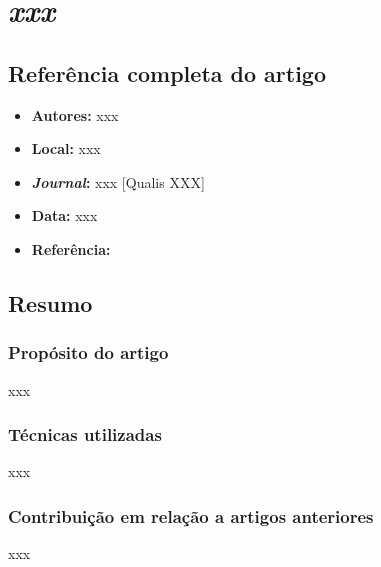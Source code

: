 \section{\textit{xxx}}


\subsection{Referência completa do artigo}

\begin{itemize}
  \item \textbf{Autores:} xxx
  \item \textbf{Local:} xxx
  \item \textbf{\textit{Journal}:} xxx [Qualis XXX]
  \item \textbf{Data:} xxx
  \item \textbf{Referência:} 
\end{itemize}


\subsection{Resumo}
\subsubsection{Propósito do artigo}
xxx

\subsubsection{Técnicas utilizadas} 
xxx

\subsubsection{Contribuição em relação a artigos anteriores} %
xxx

